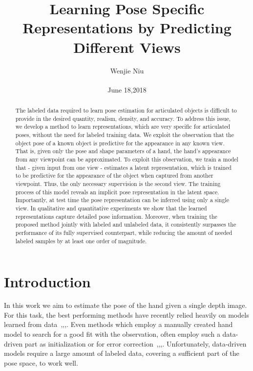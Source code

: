 \documentclass[10pt,twocolumn,letterpaper]{article}
\begin{document}
\title{Learning Pose Specific Representations by Predicting Different Views}

\author{Wenjie Niu\\\\ June 18,2018}

\maketitle

\begin{abstract}
The labeled data required to learn pose estimation for
articulated objects is difficult to provide in the desired quantity,
realism, density, and accuracy. To address this issue,
we develop a method to learn representations, which are
very specific for articulated poses, without the need for labeled
training data. We exploit the observation that the object
pose of a known object is predictive for the appearance
in any known view. That is, given only the pose and
shape parameters of a hand, the hand’s appearance from
any viewpoint can be approximated. To exploit this observation,
we train a model that - given input from one view
- estimates a latent representation, which is trained to be
predictive for the appearance of the object when captured
from another viewpoint. Thus, the only necessary supervision
is the second view. The training process of this model
reveals an implicit pose representation in the latent space.
Importantly, at test time the pose representation can be inferred
using only a single view. In qualitative and quantitative
experiments we show that the learned representations
capture detailed pose information. Moreover, when
training the proposed method jointly with labeled and unlabeled
data, it consistently surpasses the performance of its
fully supervised counterpart, while reducing the amount of
needed labeled samples by at least one order of magnitude.\cite{Poier_2018_CVPR}\par
\end{abstract}

\section{Introduction}
In this work we aim to estimate the pose of the hand
given a single depth image. For this task, the best performing
methods have recently relied heavily on models learned
from data~\cite{Hotelling1933Analysis},\cite{Oberweger2015Training},\cite{Xiao_2015_CVPR},\cite{Supancic2015Depth}. Even methods which employ a
manually created hand model to search for a good fit with
the observation, often employ such a data-driven part as initialization
or for error correction~\cite{Krejov2016Guided},\cite{Tang2015Opening},\cite{Taylor2016Efficient},\cite{Spatial2016Ye}. Unfortunately,
data-driven models require a large amount of labeled
data, covering a sufficient part of the pose space, to work
well.\par
\end{document}
